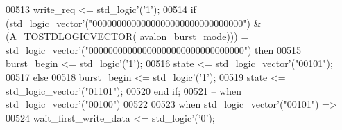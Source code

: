 \begin{DoxyCode}
00513               \textcolor{vhdlchar}{write_req} \textcolor{vhdlchar}{<=} \textcolor{comment}{std\_logic}\textcolor{vhdlchar}{'}\textcolor{vhdlchar}{(}\textcolor{vhdlchar}{'}\textcolor{vhdllogic}{}\textcolor{vhdllogic}{1}\textcolor{vhdlchar}{'}\textcolor{vhdlchar}{)};
00514               \textcolor{keywordflow}{if} \textcolor{vhdlchar}{(}\textcolor{comment}{std\_logic\_vector}\textcolor{vhdlchar}{'}\textcolor{vhdlchar}{(}\textcolor{vhdllogic}{"0000000000000000000000000000000"}\textcolor{vhdlchar}{)} \textcolor{vhdlchar}{&} \textcolor{vhdlchar}{(}\textcolor{vhdlchar}{A\_TOSTDLOGICVECTOR}\textcolor{vhdlchar}{(}\textcolor{vhdlchar}{
      avalon_burst_mode}\textcolor{vhdlchar}{)}\textcolor{vhdlchar}{)}\textcolor{vhdlchar}{)} \textcolor{vhdlchar}{=} \textcolor{comment}{std\_logic\_vector}\textcolor{vhdlchar}{'}\textcolor{vhdlchar}{(}\textcolor{vhdllogic}{"00000000000000000000000000000000"}\textcolor{vhdlchar}{)} \textcolor{keywordflow}{then} 
00515                 \textcolor{vhdlchar}{burst_begin} \textcolor{vhdlchar}{<=} \textcolor{comment}{std\_logic}\textcolor{vhdlchar}{'}\textcolor{vhdlchar}{(}\textcolor{vhdlchar}{'}\textcolor{vhdllogic}{}\textcolor{vhdllogic}{1}\textcolor{vhdlchar}{'}\textcolor{vhdlchar}{)};
00516                 \textcolor{vhdlchar}{state} \textcolor{vhdlchar}{<=} \textcolor{comment}{std\_logic\_vector}\textcolor{vhdlchar}{'}\textcolor{vhdlchar}{(}\textcolor{vhdllogic}{"00101"}\textcolor{vhdlchar}{)};
00517               \textcolor{keywordflow}{else}
00518                 \textcolor{vhdlchar}{burst_begin} \textcolor{vhdlchar}{<=} \textcolor{comment}{std\_logic}\textcolor{vhdlchar}{'}\textcolor{vhdlchar}{(}\textcolor{vhdlchar}{'}\textcolor{vhdllogic}{}\textcolor{vhdllogic}{1}\textcolor{vhdlchar}{'}\textcolor{vhdlchar}{)};
00519                 \textcolor{vhdlchar}{state} \textcolor{vhdlchar}{<=} \textcolor{comment}{std\_logic\_vector}\textcolor{vhdlchar}{'}\textcolor{vhdlchar}{(}\textcolor{vhdllogic}{"01101"}\textcolor{vhdlchar}{)};
00520               \textcolor{keywordflow}{end} \textcolor{keywordflow}{if};
00521 \textcolor{keyword}{          -- when std\_logic\_vector'("00100") }
00522       
00523           \textcolor{keywordflow}{when} \textcolor{comment}{std\_logic\_vector}\textcolor{vhdlchar}{'}\textcolor{vhdlchar}{(}\textcolor{vhdllogic}{"00101"}\textcolor{vhdlchar}{)} \textcolor{vhdlchar}{=}\textcolor{vhdlchar}{>} 
00524               \textcolor{vhdlchar}{wait_first_write_data} \textcolor{vhdlchar}{<=} \textcolor{comment}{std\_logic}\textcolor{vhdlchar}{'}\textcolor{vhdlchar}{(}\textcolor{vhdlchar}{'}\textcolor{vhdllogic}{}\textcolor{vhdllogic}{0}\textcolor{vhdlchar}{'}\textcolor{vhdlchar}{)};

\end{DoxyCode}
